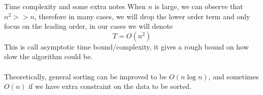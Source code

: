 \documentclass[10pt,xcolor={table,dvipsnames},t]{beamer}
\begin{document}
\begin{frame}{Time complexity and some extra notes}
When $n$ is large, we can observe that $n^{2}>>n$, therefore in many cases, we will drop the lower order term and only focus on the leading order, in our cases we will denote
$$T=O(n^{2})$$
This is call asymptotic time bound/complexity, it gives a rough bound on how slow the algorithm could be.\\\enspace\\
Theoretically, general sorting can be improved to be $O(n\log n)$, and sometimes $O(n)$ if we have extra constraint on the data to be sorted.
\end{frame}
\end{document}
